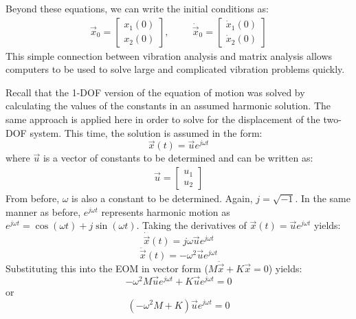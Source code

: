 \documentclass[12pt,letter]{article}
\begin{document}
Beyond these equations, we can write the initial conditions as:
\begin{eqnarray}
\vec{x}_0=  \begin{bmatrix} x_1(0) \\  x_2(0) \end{bmatrix},  \hspace{1cm} \dot{\vec{x}}_0=  \begin{bmatrix} \dot{x}_1(0) \\  \dot{x}_2(0) \end{bmatrix}
\end{eqnarray}
This simple connection between vibration analysis and matrix analysis allows computers to be used to solve large and complicated vibration problems quickly.


Recall that the 1-DOF version of the equation of motion was solved by calculating the values of the constants in an assumed harmonic solution. The same approach is applied here in order to solve for the displacement of the two-DOF system. This time, the solution is assumed in the form:
\begin{equation}
 \vec{x}(t) = \vec{u}e^{j\omega t}
\end{equation}
where $\vec{u}$ is a vector of constants to be determined and can be written as:
\begin{eqnarray}
\vec{u}=  \begin{bmatrix} u_1 \\  u_2 \end{bmatrix}
\end{eqnarray}
From before, $\omega$ is also a constant to be determined. Again, $j=\sqrt{-1}$. In the same manner as before, $e^{j\omega t}$ represents harmonic motion as $e^{j\omega t} = \cos(\omega t) + j \sin(\omega t)$. Taking the derivatives of $\vec{x}(t) = \vec{u}e^{j\omega t}$ yields:
\begin{equation}
 \dot{\vec{x}}(t) = j\omega\vec{u}e^{j\omega t}
\end{equation}
\begin{equation}
 \ddot{\vec{x}}(t) = -\omega^2\vec{u}e^{j\omega t}
\end{equation}
Substituting this into the EOM in vector form ($M\ddot{\vec{x}} + K\vec{x} =0$) yields:
\begin{equation}
-\omega^2 M  \vec{u}e^{j\omega t} + K\vec{u}e^{j\omega t} =0
\end{equation}
or 
\begin{equation}
(-\omega^2 M  + K)\vec{u}e^{j\omega t} =0
\end{equation}
\end{document}
